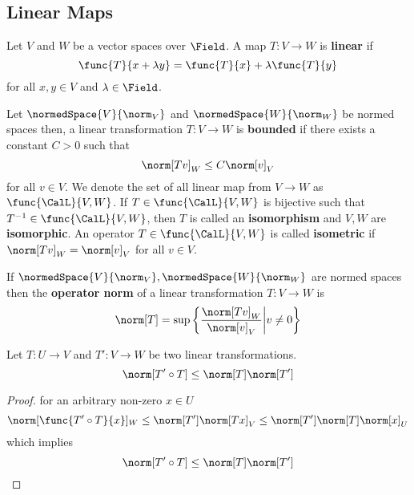 \subsection{Linear Maps}
Let \(V\) and \(W\) be a vector spaces over \(\Field\). A map \(T: V \to W\) is \textbf{linear} if
\begin{equation*}
    \func{T}{x + \lambda y} = \func{T}{x} + \lambda \func{T}{y}
\end{equation*}
for all \(x,y \in V\) and \(\lambda \in \Field\).

\begin{definition}
    Let \(\normedSpace{V}{\norm_V}\) and \(\normedSpace{W}{\norm_W}\) be normed spaces then, a linear transformation \(T : V \to W\) is \textbf{bounded} if there exists a constant \(C > 0\) such that
    \begin{equation*}
        \norm[Tv]_W \leq C \norm[v]_V
    \end{equation*}
    for all \(v \in V\). We denote the set of all linear map from \(V \to W\) as \(\func{\CalL}{V,W}\). If \(T \in \func{\CalL}{V,W}\) is bijective such that \(T^{-1} \in \func{\CalL}{V,W}\), then \(T\) is called an \textbf{isomorphism} and \(V,W\) are \textbf{isomorphic}. An operator \(T \in \func{\CalL}{V,W}\) is called \textbf{isometric} if \(\norm[Tv]_W = \norm[v]_V\) for all \(v \in V\).
\end{definition}

\begin{definition}
    If \(\normedSpace{V}{\norm_V},\normedSpace{W}{\norm_W}\) are normed spaces then the \textbf{operator norm} of a linear transformation \(T : V \to W\) is
    \begin{equation*}
        \norm[T] = \sup \left\{\dfrac{\norm[Tv]_W}{\norm[v]_V} \middle| v \neq 0 \right\}
    \end{equation*}
\end{definition}

\begin{proposition}
    Let \(T : U \to V\) and \(T' : V \to W\) be two linear transformations.
    \begin{equation*}
        \norm[T' \circ T] \leq \norm[T] \norm[T']
    \end{equation*}
\end{proposition}

\begin{proof}
    for an arbitrary non-zero \(x \in U\)
    \begin{equation*}
        \norm[\func{T' \circ T}{x}]_W \leq \norm[T'] \norm[Tx]_V \leq \norm[T'] \norm[T] \norm[x]_U
    \end{equation*}
    which implies
    \begin{equation*}
        \norm[T' \circ T] \leq \norm[T] \norm[T']
    \end{equation*}
\end{proof}

